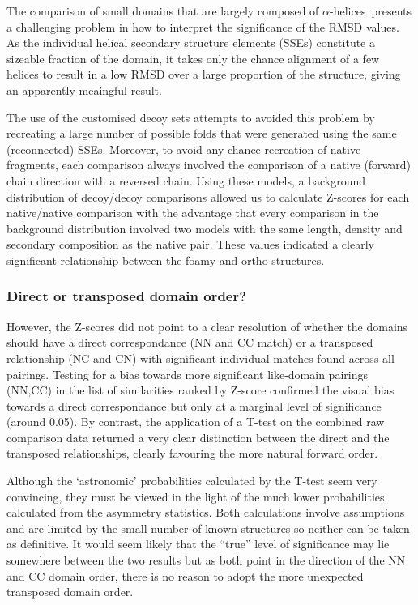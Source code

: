 \documentclass[12pt]{article}
\newcommand{\AHs}{$\alpha$-helices}
\newcommand{\3}{$3_{10}$}
\begin{document}
The comparison of small domains that are largely composed of \AHs\ presents a challenging problem in how
to interpret the significance of the RMSD values.  As the individual helical secondary structure elements
(SSEs) constitute a sizeable fraction of the domain, it takes only the chance alignment of a few helices
to result in a low RMSD over a large proportion of the structure, giving an apparently meaingful result.  

The use of
the customised decoy sets attempts to avoided this problem by recreating a large number of possible folds
that were generated using the same (reconnected) SSEs.   Moreover, to avoid any chance recreation of native fragments,
each comparison always involved the comparison of a native (forward) chain direction with a reversed chain.
Using these models, a background distribution of decoy/decoy comparisons allowed us to calculate Z-scores
for each native/native comparison with the advantage that every comparison in the background distribution
involved two models with the same length, density and secondary composition as the native pair.
These values indicated a clearly significant relationship between the foamy and ortho structures.   

\subsubsection{Direct or transposed domain order?}

However, the Z-scores did not point to a clear resolution of whether the domains should have a direct
correspondance (NN and CC match) or a transposed relationship (NC and CN) with significant individual
matches found across all pairings.  Testing for a bias towards more significant like-domain pairings (NN,CC)
in the list of similarities ranked by Z-score confirmed the visual bias towards a direct correspondance
but only at a marginal level of significance (around 0.05).  By contrast, the application of a T-test on the
combined raw comparison data returned a very clear distinction between the direct and the transposed
relationships, clearly favouring the more natural forward order.  

Although the `astronomic' probabilities calculated by the T-test seem very convincing, they
must be viewed in the light of the much lower probabilities calculated from the asymmetry
statistics.   Both calculations involve assumptions and are limited by the small number of known
structures so neither can be taken as definitive.    It would seem likely that the ``true'' level of 
significance may lie somewhere between the two results but as both point in the direction of the NN and CC 
domain order, there is no reason to adopt the more unexpected transposed domain order. 
\end{document}
